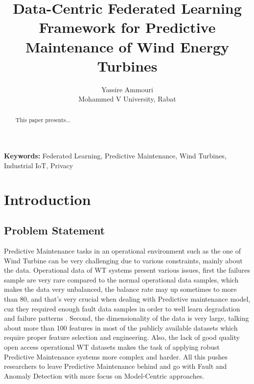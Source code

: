 \documentclass[12pt]{article}
\title{Data-Centric Federated Learning Framework for Predictive Maintenance of Wind Energy Turbines}
\author{Yassire Ammouri \\ Mohammed V University, Rabat}
\date{}
\begin{document}
\maketitle

\begin{abstract}
This paper presents...
\end{abstract}

\textbf{Keywords:} Federated Learning, Predictive Maintenance, Wind Turbines, Industrial IoT, Privacy

\section{Introduction}
\subsection{Problem Statement }
Predictive Maintenance tasks in an operational environment such as the one of Wind Turbine can be very challenging due to various constraints, mainly about the data. Operational data of WT systems present various issues, first the failures sample are very rare compared to the normal operational data samples, which makes the data very unbalanced, the balance rate may up sometimes to more than 80, and that's very crucial when dealing with Predictive maintenance model, cuz they required enough fault data samples in order to well learn degradation and failure patterns . Second, the dimensionality of the data is very large, talking about more than 100 features in most of the publicly available datasets which require proper feature selection and engineering. Also, the lack of good quality open access operational WT datasets makes the task of applying robust Predictive Maintenance systems more complex and harder. All this pushes researchers to leave Predictive Maintenance behind and go with Fault and Anomaly Detection with more focus on Model-Centric approaches.



\end{document}
